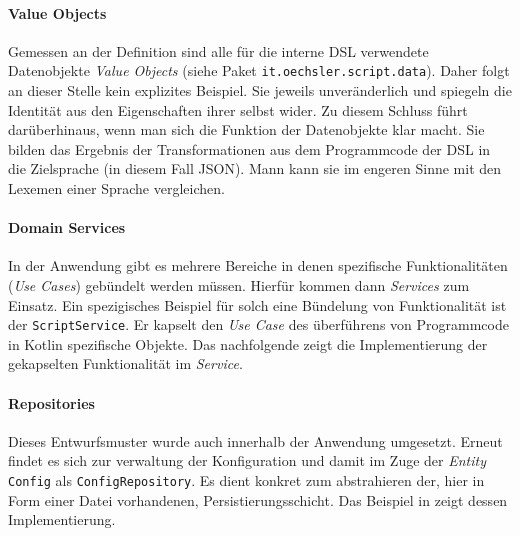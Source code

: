 \bgroup

    \label{lst:config}
\egroup

\paragraph{Value Objects} 

Gemessen an der Definition sind alle für die interne DSL verwendete Datenobjekte \emph{Value Objects} (siehe Paket \texttt{it.oechsler.script.data}).
Daher folgt an dieser Stelle kein explizites Beispiel.
Sie jeweils unveränderlich und spiegeln die Identität aus den Eigenschaften ihrer selbst wider.
Zu diesem Schluss führt darüberhinaus, wenn man sich die Funktion der Datenobjekte klar macht.
Sie bilden das Ergebnis der Transformationen aus dem Programmcode der DSL in die Zielsprache (in diesem Fall JSON).
Mann kann sie im engeren Sinne mit den Lexemen einer Sprache vergleichen.

\paragraph{Domain Services}

In der Anwendung gibt es mehrere Bereiche in denen spezifische Funktionalitäten (\emph{Use Cases}) gebündelt werden müssen.
Hierfür kommen dann \emph{Services} zum Einsatz.
Ein spezigisches Beispiel für solch eine Bündelung von Funktionalität ist der \texttt{ScriptService}.
Er kapselt den \emph{Use Case} des überführens von Programmcode in Kotlin spezifische Objekte. Das nachfolgende  zeigt die Implementierung der gekapselten Funktionalität im \emph{Service}.

\bgroup

    \label{lst:script_service}
\egroup

\paragraph{Repositories}

Dieses Entwurfsmuster wurde auch innerhalb der Anwendung umgesetzt.
Erneut findet es sich zur verwaltung der Konfiguration und damit im Zuge der \emph{Entity} \texttt{Config} als \texttt{ConfigRepository}.
Es dient konkret zum abstrahieren der, hier in Form einer Datei vorhandenen, Persistierungsschicht.
Das Beispiel in  zeigt dessen Implementierung.

\bgroup

    \label{lst:config_repository}
\egroup